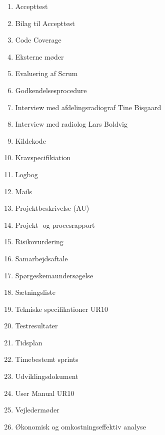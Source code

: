 \begin{enumerate}
\item Accepttest 					 		\label{Accepttest}
\item Bilag til Accepttest						\label{BilagAccepttest}
\item Code Coverage 						\label{Code Coverage}
\item Eksterne møder						\label{Eksterne moder} 
\item Evaluering af Scrum 						\label{Evaluering Scrum} 
\item Godkendelsesprocedure 					\label{Godkendelsesprocedure}
\item Interview med afdelingsradiograf Tine Bisgaard 	\label{Tine}
\item Interview med radiolog Lars Boldvig  			\label{Telefoninterview}
\item Kildekode							\label{Kildekode} 
\item Kravspecifikiation 						\label{Kravspecifikation}
\item Logbog								\label{Logbog}
\item Mails								\label{Mails}
\item Projektbeskrivelse (AU) 					\label{Projektbeskrivelse}
\item Projekt- og procesrapport 					
\item Risikovurdering 						\label{Risikovurdering} 
\item Samarbejdsaftale						\label{Samarbejdesaftale} 
\item Spørgeskemaundersøgelse 					\label{Sporgeskemaundersogelse}
\item Sætningsliste 							\label{Satningsliste}
\item Tekniske specifikationer UR10				\label{UR10spec}
\item Testresultater 						\label{TestResultater}
\item Tidsplan							\label{Tidsplan}
\item Timebestemt sprints 						\label{Timebestemt sprints}
\item Udviklingsdokument 						\label{Udviklingsdokument}
\item User Manual UR10 						\label{UserManualUR10}
\item Vejledermøder						\label{Vejledermoder}
\item Økonomisk og omkostningseffektiv analyse		\label{Okonomi}
\end{enumerate}


